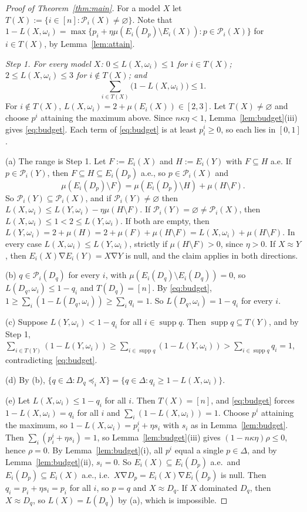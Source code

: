 \documentclass[11pt]{article}
\theoremstyle{definition}
\newcommand{\supp}{\operatorname{supp}}
\newcommand{\Pc}{\mathcal P}
\newcommand{\sd}{\mathbin{\nabla}}
\begin{document}
\begin{proof}[Proof of Theorem~\ref{thm:main}]
For a model $X$ let $T(X):=\{i\in[n]:\Pc_i(X)\neq\varnothing\}$. Note that $1-L(X,\omega_i)=\max\{p_i+\eta\mu(E_i(D_p)\setminus E_i(X)):p\in\Pc_i(X)\}$ for $i\in T(X)$, by Lemma~\ref{lem:attain}.

\emph{Step 1. For every model $X$: $0\le L(X,\omega_i)\le1$ for $i\in T(X)$; $2\le L(X,\omega_i)\le3$ for $i\notin T(X)$; and}
\begin{equation}\label{eq:budget}
\sum_{i\in T(X)}\big(1-L(X,\omega_i)\big)\le1.
\end{equation}
For $i\notin T(X)$, $L(X,\omega_i)=2+\mu(E_i(X))\in[2,3]$. Let $T(X)\neq\varnothing$ and choose $p^i$ attaining the maximum above. Since $n\kappa\eta<1$, Lemma~\ref{lem:budget}(iii) gives \eqref{eq:budget}. Each term of \eqref{eq:budget} is at least $p^i_i\ge0$, so each lies in $[0,1]$.

(a) The range is Step 1. Let $F:=E_i(X)$ and $H:=E_i(Y)$ with $F\subseteq H$ a.e. If $p\in\Pc_i(Y)$, then $F\subseteq H\subseteq E_i(D_p)$ a.e., so $p\in\Pc_i(X)$ and
\[
\mu(E_i(D_p)\setminus F)=\mu(E_i(D_p)\setminus H)+\mu(H\setminus F).
\]
So $\Pc_i(Y)\subseteq\Pc_i(X)$, and if $\Pc_i(Y)\neq\varnothing$ then $L(X,\omega_i)\le L(Y,\omega_i)-\eta\mu(H\setminus F)$. If $\Pc_i(Y)=\varnothing\neq\Pc_i(X)$, then $L(X,\omega_i)\le1<2\le L(Y,\omega_i)$. If both are empty, then $L(Y,\omega_i)=2+\mu(H)=2+\mu(F)+\mu(H\setminus F)=L(X,\omega_i)+\mu(H\setminus F)$. In every case $L(X,\omega_i)\le L(Y,\omega_i)$, strictly if $\mu(H\setminus F)>0$, since $\eta>0$. If $X\approx Y$, then $E_i(X)\sd E_i(Y)=X\sd Y$ is null, and the claim applies in both directions.

(b) $q\in\Pc_i(D_q)$ for every $i$, with $\mu(E_i(D_q)\setminus E_i(D_q))=0$, so $L(D_q,\omega_i)\le1-q_i$ and $T(D_q)=[n]$. By \eqref{eq:budget}, $1\ge\sum_i(1-L(D_q,\omega_i))\ge\sum_iq_i=1$. So $L(D_q,\omega_i)=1-q_i$ for every $i$.

(c) Suppose $L(Y,\omega_i)<1-q_i$ for all $i\in\supp q$. Then $\supp q\subseteq T(Y)$, and by Step 1, $\sum_{i\in T(Y)}(1-L(Y,\omega_i))\ge\sum_{i\in\supp q}(1-L(Y,\omega_i))>\sum_{i\in\supp q}q_i=1$, contradicting \eqref{eq:budget}.

(d) By (b), $\{q\in\Delta:D_q\preceq_iX\}=\{q\in\Delta:q_i\ge1-L(X,\omega_i)\}$.

(e) Let $L(X,\omega_i)\le1-q_i$ for all $i$. Then $T(X)=[n]$, and \eqref{eq:budget} forces $1-L(X,\omega_i)=q_i$ for all $i$ and $\sum_i(1-L(X,\omega_i))=1$. Choose $p^i$ attaining the maximum, so $1-L(X,\omega_i)=p^i_i+\eta s_i$ with $s_i$ as in Lemma~\ref{lem:budget}. Then $\sum_i(p^i_i+\eta s_i)=1$, so Lemma~\ref{lem:budget}(iii) gives $(1-n\kappa\eta)\rho\le0$, hence $\rho=0$. By Lemma~\ref{lem:budget}(i), all $p^i$ equal a single $p\in\Delta$, and by Lemma~\ref{lem:budget}(ii), $s_i=0$. So $E_i(X)\subseteq E_i(D_p)$ a.e.\ and $E_i(D_p)\subseteq E_i(X)$ a.e., i.e.\ $X\sd D_p=E_i(X)\sd E_i(D_p)$ is null. Then $q_i=p_i+\eta s_i=p_i$ for all $i$, so $p=q$ and $X\approx D_q$. If $X$ dominated $D_q$, then $X\approx D_q$, so $L(X)=L(D_q)$ by (a), which is impossible.


\end{proof}
\end{document}
